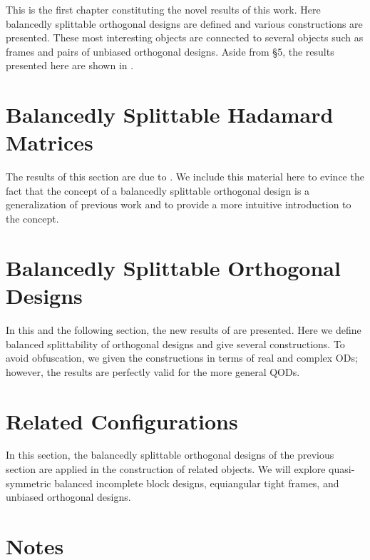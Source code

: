 \documentclass[../../main]{subfiles}
\begin{document}
This is the first chapter constituting the novel results of this work. Here
balancedly splittable orthogonal designs are defined and various constructions
are presented. These most interesting objects are connected to several objects
such as frames and pairs of unbiased orthogonal designs. Aside from \S 5, the
results presented here are shown in \cite{split-od}.


 \section{\centering Balancedly Splittable Hadamard Matrices}
 The results of this section are due to \cite{splittable-hadamard}. We include
 this material here to evince the fact that the concept of a balancedly
 splittable orthogonal design is a generalization of previous work and to
 provide a more intuitive introduction to the concept. 
 
 \dinkus
 
 
 
 \section{\centering Balancedly Splittable Orthogonal Designs}
 In this and the following section, the new results of \cite{split-od} are presented. Here we define balanced splittability of orthogonal designs and give several constructions. To avoid obfuscation, we given the constructions in terms of real and complex ODs; however, the results are perfectly valid for the more general QODs.
 
 \dinkus
 
 
 
 \section{\centering Related Configurations}
 In this section, the balancedly splittable orthogonal designs of the previous section are applied in the construction of related objects. We will explore quasi-symmetric balanced incomplete block designs, equiangular tight frames, and unbiased orthogonal designs.
 
 \dinkus
 
 
 
 \singlespace
 
 \section*{\centering Notes}
 \thednotes
 
 \doublespacing
 
 \biblio
\end{document}
